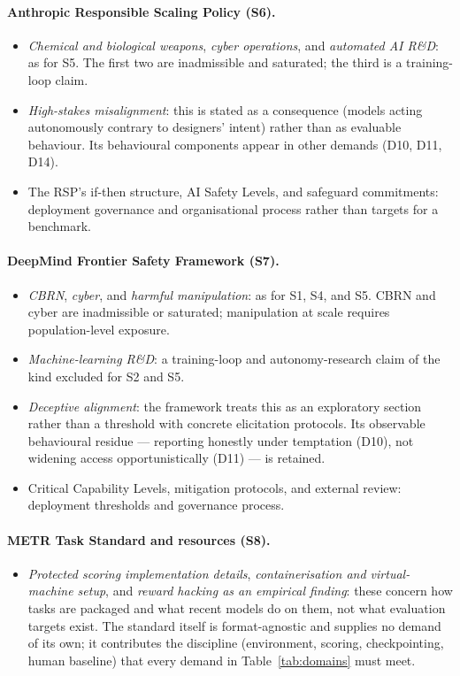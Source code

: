 \paragraph{Anthropic Responsible Scaling Policy (S6).}
\begin{itemize}
\item \emph{Chemical and biological weapons}, \emph{cyber operations}, and \emph{automated AI R\&D}: as for S5. The first two are inadmissible and saturated; the third is a training-loop claim.
\item \emph{High-stakes misalignment}: this is stated as a consequence (models acting autonomously contrary to designers' intent) rather than as evaluable behaviour. Its behavioural components appear in other demands (D10, D11, D14).
\item The RSP's if-then structure, AI Safety Levels, and safeguard commitments: deployment governance and organisational process rather than targets for a benchmark.
\end{itemize}

\paragraph{DeepMind Frontier Safety Framework (S7).}
\begin{itemize}
\item \emph{CBRN}, \emph{cyber}, and \emph{harmful manipulation}: as for S1, S4, and S5. CBRN and cyber are inadmissible or saturated; manipulation at scale requires population-level exposure.
\item \emph{Machine-learning R\&D}: a training-loop and autonomy-research claim of the kind excluded for S2 and S5.
\item \emph{Deceptive alignment}: the framework treats this as an exploratory section rather than a threshold with concrete elicitation protocols. Its observable behavioural residue --- reporting honestly under temptation (D10), not widening access opportunistically (D11) --- is retained.
\item Critical Capability Levels, mitigation protocols, and external review: deployment thresholds and governance process.
\end{itemize}

\paragraph{METR Task Standard and resources (S8).}
\begin{itemize}
\item \emph{Protected scoring implementation details}, \emph{containerisation and virtual-machine setup}, and \emph{reward hacking as an empirical finding}: these concern how tasks are packaged and what recent models do on them, not what evaluation targets exist. The standard itself is format-agnostic and supplies no demand of its own; it contributes the discipline (environment, scoring, checkpointing, human baseline) that every demand in Table~\ref{tab:domains} must meet.
\end{itemize}

